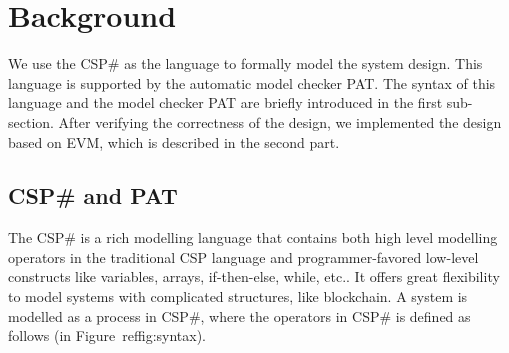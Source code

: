 \documentclass{KERauth}
\begin{document}
\section{Background}
We use the CSP\# as the language to formally model the system design.
This language is supported by the automatic model checker PAT. The syntax of this language and the model checker PAT are briefly introduced in the first sub-section. After verifying the correctness of the design, we implemented the design based on EVM, which is described in the second part.

\subsection{CSP\# and PAT}

The CSP\# is a rich modelling language that contains both high level modelling operators in the traditional CSP language and programmer-favored low-level constructs like variables, arrays, if-then-else, while, etc..  It offers great flexibility to model systems with complicated structures, like blockchain. A system is modelled as a process in CSP\#, where the operators in CSP\# is defined as follows (in Figure~ref{fig:syntax}).
\end{document}
